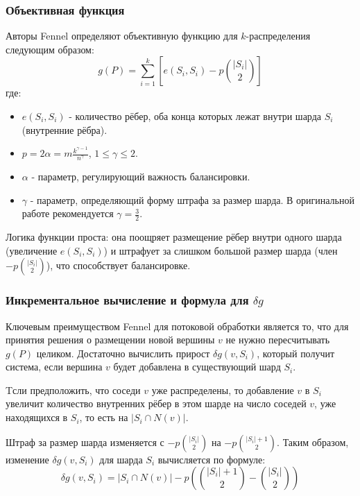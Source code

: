 \subsubsection{Объективная функция}

Авторы Fennel определяют объективную функцию для \(k\)-распределения следующим образом:
\begin{equation*}
    g(P)=\sum_{i=1}^k[e(S_i,S_i) - p\binom{|S_i|}{2}]
\end{equation*}
где:
\begin{itemize}
    \item \(e(S_i, S_i)\) - количество рёбер, оба конца которых лежат внутри шарда \(S_i\) (внутренние рёбра).
    \item $p=2\alpha=m\frac{k^{\gamma-1}}{n^\gamma}$, $1\le\gamma\le 2$.
    \item \(\alpha\) - параметр, регулирующий важность балансировки. 
    \item \(\gamma\) - параметр, определяющий форму штрафа за размер шарда. В оригинальной работе рекомендуется \(\gamma = \frac{3}{2}\).
\end{itemize}
Логика функции проста: она поощряет размещение рёбер внутри одного шарда (увеличение \(e(S_i, S_i)\)) и штрафует за слишком большой размер шарда (член \(- p\binom{|S_i|}{2}\)), что способствует балансировке.

\subsubsection{Инкрементальное вычисление и формула для \(\delta g\)}

Ключевым преимуществом Fennel для потоковой обработки является то, что для принятия решения о размещении новой вершины \(v\) не нужно пересчитывать \(g(P)\) целиком. Достаточно вычислить прирост \(\delta g(v, S_i)\), который получит система, если вершина \(v\) будет добавлена в существующий шард \(S_i\).

Tсли предположить, что соседи \(v\) уже распределены, то добавление \(v\) в \(S_i\) увеличит количество внутренних рёбер в этом шарде на число соседей \(v\), уже находящихся в \(S_i\), то есть на \(|S_i \cap N(v)|\).

Штраф за размер шарда изменяется с \(- p\binom{|S_i|}{2}\) на \(- p\binom{|S_i|+1}{2}\). Таким образом, изменение \(\delta g(v, S_i)\) для шарда \(S_i\) вычисляется по формуле:
\begin{equation} \label{eq:fennel_delta}
\delta g(v, S_i) = |S_i \cap N(v)| - p (\binom{|S_i|+1}{2} - \binom{|S_i|}{2})
\end{equation}

